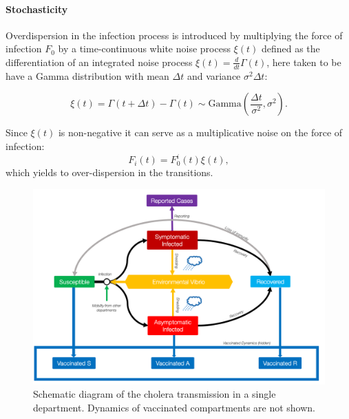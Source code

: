     
\paragraph{Stochasticity} Overdispersion in the infection process is introduced by multiplying the force of infection $F_0$ by a time-continuous white noise process \(\xi(t)\) defined as the differentiation of an integrated noise process \(\xi(t) = \frac{d}{dt}\Gamma(t)\), here taken to be have a Gamma distribution with mean \(\Delta t\) and variance \(\sigma^2 \Delta t\)\cite[-3\baselineskip]{Breto:CompoundMarkovCounting:2011}:

\[
\xi(t) = \Gamma (t+\Delta t) - \Gamma (t) \sim \text{Gamma}\left( \frac{\Delta t}{\sigma^2}, \sigma^2\right).
\]

Since \(\xi(t)\) is non-negative it can serve as a multiplicative noise on
the force of infection: \[
F_i(t) = F^i_0(t) \xi(t),
\]
which yields to over-dispersion in the transitions.

\begin{figure}%
\begin{center}
\includegraphics{fig_cholera-haiti-ocv/compartiments.png}
\caption[Schematic diagram of the cholera transmission in a single department]{Schematic diagram of the cholera transmission in a single department. Dynamics of vaccinated compartments are not shown.}
\label{figEPFL}
\end{center}
\end{figure}

